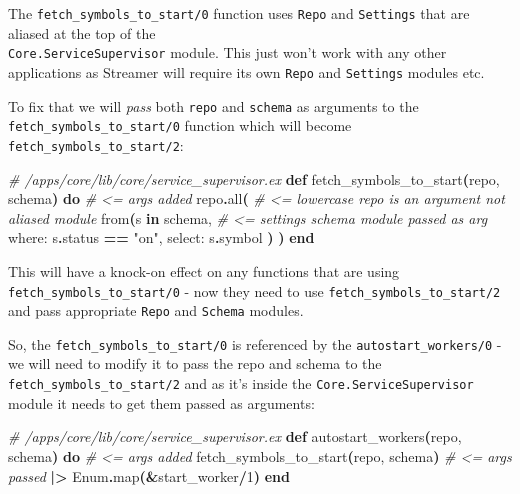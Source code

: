 \documentclass[
  oneside]{book}
\newenvironment{Shaded}{\begin{snugshade}}{\end{snugshade}}
\newcommand{\CommentTok}[1]{\textcolor[rgb]{0.56,0.35,0.01}{\textit{#1}}}
\newcommand{\ConstantTok}[1]{\textcolor[rgb]{0.56,0.35,0.01}{#1}}
\newcommand{\DecValTok}[1]{\textcolor[rgb]{0.00,0.00,0.81}{#1}}
\newcommand{\FunctionTok}[1]{\textcolor[rgb]{0.13,0.29,0.53}{\textbf{#1}}}
\newcommand{\KeywordTok}[1]{\textcolor[rgb]{0.13,0.29,0.53}{\textbf{#1}}}
\newcommand{\NormalTok}[1]{#1}
\newcommand{\OperatorTok}[1]{\textcolor[rgb]{0.81,0.36,0.00}{\textbf{#1}}}
\newcommand{\StringTok}[1]{\textcolor[rgb]{0.31,0.60,0.02}{#1}}
\newcommand{\VariableTok}[1]{\textcolor[rgb]{0.00,0.00,0.00}{#1}}
\begin{document}
The \texttt{fetch\_symbols\_to\_start/0} function uses \texttt{Repo} and \texttt{Settings} that are aliased at the top of the\\
\texttt{Core.ServiceSupervisor} module. This just won't work with any other applications as Streamer will require its own \texttt{Repo} and \texttt{Settings} modules etc.

To fix that we will \emph{pass} both \texttt{repo} and \texttt{schema} as arguments to the \texttt{fetch\_symbols\_to\_start/0} function which will become \texttt{fetch\_symbols\_to\_start/2}:

\begin{Shaded}
\begin{Highlighting}[]
  \CommentTok{\# /apps/core/lib/core/service\_supervisor.ex}
  \KeywordTok{def}\NormalTok{ fetch\_symbols\_to\_start}\FunctionTok{(}\NormalTok{repo, schema}\FunctionTok{)} \KeywordTok{do} \CommentTok{\# \textless{}= args added}
\NormalTok{    repo}\OperatorTok{.}\NormalTok{all}\FunctionTok{(} \CommentTok{\# \textless{}= lowercase \textasciigrave{}repo\textasciigrave{} is an argument not aliased module}
\NormalTok{      from}\FunctionTok{(}\NormalTok{s }\KeywordTok{in}\NormalTok{ schema, }\CommentTok{\# \textless{}= settings schema module passed as arg}
        \VariableTok{where:}\NormalTok{ s}\OperatorTok{.}\NormalTok{status }\OperatorTok{==} \StringTok{"on"}\NormalTok{,}
        \VariableTok{select:}\NormalTok{ s}\OperatorTok{.}\NormalTok{symbol}
      \FunctionTok{)}
    \FunctionTok{)}
  \KeywordTok{end}
\end{Highlighting}
\end{Shaded}

This will have a knock-on effect on any functions that are using \texttt{fetch\_symbols\_to\_start/0} - now they need to use \texttt{fetch\_symbols\_to\_start/2} and pass appropriate \texttt{Repo} and \texttt{Schema} modules.

So, the \texttt{fetch\_symbols\_to\_start/0} is referenced by the \texttt{autostart\_workers/0} - we will need to modify it to pass the repo and schema to the \texttt{fetch\_symbols\_to\_start/2} and as it's inside the \texttt{Core.ServiceSupervisor} module it needs to get them passed as arguments:

\begin{Shaded}
\begin{Highlighting}[]
  \CommentTok{\# /apps/core/lib/core/service\_supervisor.ex}
  \KeywordTok{def}\NormalTok{ autostart\_workers}\FunctionTok{(}\NormalTok{repo, schema}\FunctionTok{)} \KeywordTok{do} \CommentTok{\# \textless{}= args added}
\NormalTok{    fetch\_symbols\_to\_start}\FunctionTok{(}\NormalTok{repo, schema}\FunctionTok{)} \CommentTok{\# \textless{}= args passed}
    \OperatorTok{|\textgreater{}} \ConstantTok{Enum}\OperatorTok{.}\NormalTok{map}\FunctionTok{(}\OperatorTok{\&}\NormalTok{start\_worker}\OperatorTok{/}\DecValTok{1}\FunctionTok{)}
  \KeywordTok{end}
\end{Highlighting}
\end{Shaded}
\end{document}
